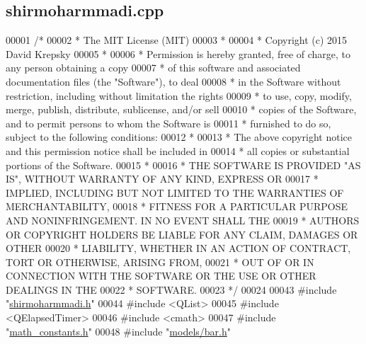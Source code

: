 \hypertarget{shirmoharmmadi_8cpp_source}{}\subsection{shirmoharmmadi.\+cpp}
\label{shirmoharmmadi_8cpp_source}

\begin{DoxyCode}
00001 \textcolor{comment}{/*}
00002 \textcolor{comment}{ * The MIT License (MIT)}
00003 \textcolor{comment}{ *}
00004 \textcolor{comment}{ * Copyright (c) 2015 David Krepsky}
00005 \textcolor{comment}{ *}
00006 \textcolor{comment}{ * Permission is hereby granted, free of charge, to any person obtaining a copy}
00007 \textcolor{comment}{ * of this software and associated documentation files (the "Software"), to deal}
00008 \textcolor{comment}{ * in the Software without restriction, including without limitation the rights}
00009 \textcolor{comment}{ * to use, copy, modify, merge, publish, distribute, sublicense, and/or sell}
00010 \textcolor{comment}{ * copies of the Software, and to permit persons to whom the Software is}
00011 \textcolor{comment}{ * furnished to do so, subject to the following conditions:}
00012 \textcolor{comment}{ *}
00013 \textcolor{comment}{ * The above copyright notice and this permission notice shall be included in}
00014 \textcolor{comment}{ * all copies or substantial portions of the Software.}
00015 \textcolor{comment}{ *}
00016 \textcolor{comment}{ * THE SOFTWARE IS PROVIDED "AS IS", WITHOUT WARRANTY OF ANY KIND, EXPRESS OR}
00017 \textcolor{comment}{ * IMPLIED, INCLUDING BUT NOT LIMITED TO THE WARRANTIES OF MERCHANTABILITY,}
00018 \textcolor{comment}{ * FITNESS FOR A PARTICULAR PURPOSE AND NONINFRINGEMENT. IN NO EVENT SHALL THE}
00019 \textcolor{comment}{ * AUTHORS OR COPYRIGHT HOLDERS BE LIABLE FOR ANY CLAIM, DAMAGES OR OTHER}
00020 \textcolor{comment}{ * LIABILITY, WHETHER IN AN ACTION OF CONTRACT, TORT OR OTHERWISE, ARISING FROM,}
00021 \textcolor{comment}{ * OUT OF OR IN CONNECTION WITH THE SOFTWARE OR THE USE OR OTHER DEALINGS IN THE}
00022 \textcolor{comment}{ * SOFTWARE.}
00023 \textcolor{comment}{ */}
00024 
00043 \textcolor{preprocessor}{#include "\hyperlink{shirmoharmmadi_8h}{shirmoharmmadi.h}"}
00044 \textcolor{preprocessor}{#include <QList>}
00045 \textcolor{preprocessor}{#include <QElapsedTimer>}
00046 \textcolor{preprocessor}{#include <cmath>}
00047 \textcolor{preprocessor}{#include "\hyperlink{math__constants_8h}{math\_constants.h}"}
00048 \textcolor{preprocessor}{#include "\hyperlink{bar_8h}{models/bar.h}"}

\end{DoxyCode}
